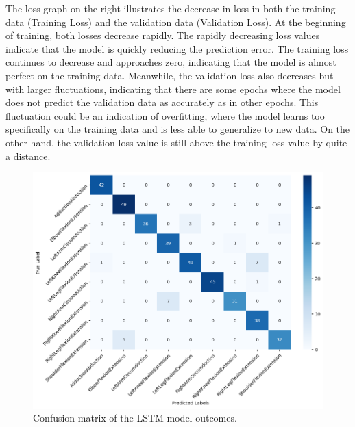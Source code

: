The loss graph on the right illustrates the decrease in loss in both the training data (Training Loss) and the validation data (Validation Loss). At the beginning of training, both losses decrease rapidly. The rapidly decreasing loss values indicate that the model is quickly reducing the prediction error. The training loss continues to decrease and approaches zero, indicating that the model is almost perfect on the training data. Meanwhile, the validation loss also decreases but with larger fluctuations, indicating that there are some epochs where the model does not predict the validation data as accurately as in other epochs. This fluctuation could be an indication of overfitting, where the model learns too specifically on the training data and is less able to generalize to new data. On the other hand, the validation loss value is still above the training loss value by quite a distance.

\begin{figure}[h!]
	\centering
	\includegraphics[width=1\textwidth]{bab4/ar_LSTM_Confmatrix.png}
	\caption{Confusion matrix of the LSTM model outcomes.}
	\label{fig:LSTM_Confmatrix}
\end{figure}

